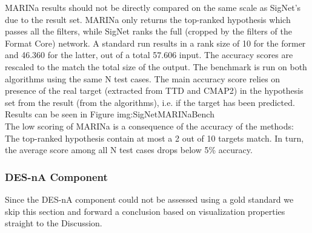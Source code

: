 MARINa results should not be directly compared on the same scale as SigNet’s due to the result set. MARINa only returns the top-ranked hypothesis which passes all the filters, while SigNet ranks the full (cropped by the filters of the Format Core) network. A standard run results in a rank size of 10 for the former and 46.360 for the latter, out of a total 57.606 input. The accuracy scores are rescaled to the match the total size of the output.
The benchmark is run on both algorithms using the same N test cases. The main accuracy score relies on presence of the real target (extracted from TTD and CMAP2) in the hypothesis set from the result (from the algorithms), i.e. if the target has been predicted. Results can be seen in Figure img:SigNetMARINaBench
\\

The low scoring of MARINa is a consequence of the accuracy of the methods: The top-ranked hypothesis contain at most a 2 out of 10 targets match. In turn, the average score among all N test cases drops below 5\% accuracy.

\subsubsection{DES-nA Component}
Since the DES-nA component could not be assessed using a gold standard we skip this section and forward a conclusion based on visualization properties straight to the Discussion.